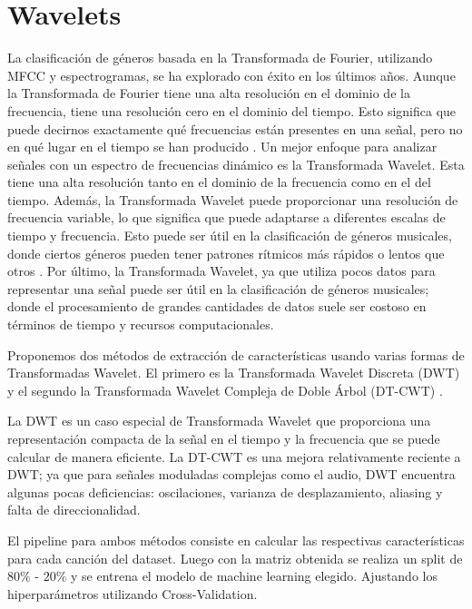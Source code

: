 \documentclass[colorinlistoftodos,twoside,twocolumn,10pt]{article} %
\begin{document}
  
	\section{Wavelets}

La clasificación de géneros basada en la Transformada de Fourier, utilizando MFCC y espectrogramas, se ha explorado con éxito en los últimos años. Aunque la Transformada de Fourier tiene una alta resolución en el dominio de la frecuencia, tiene una resolución cero en el dominio del tiempo. Esto significa que puede decirnos exactamente qué frecuencias están presentes en una señal, pero no en qué lugar en el tiempo se han producido \cite{wavelet transform in machine learning}. Un mejor enfoque para analizar señales con un espectro de frecuencias dinámico es la Transformada Wavelet. Esta tiene una alta resolución tanto en el dominio de la frecuencia como en el del tiempo. Además, la Transformada Wavelet puede proporcionar una resolución de frecuencia variable, lo que significa que puede adaptarse a diferentes escalas de tiempo y frecuencia. Esto puede ser útil en la clasificación de géneros musicales, donde ciertos géneros pueden tener patrones rítmicos más rápidos o lentos que otros \cite{Musical Genre Classification Of Audio Signals}. Por último, la Transformada Wavelet, ya que utiliza pocos datos para representar una señal puede ser útil en la clasificación de géneros musicales; donde el procesamiento de grandes cantidades de datos suele ser costoso en términos de tiempo y recursos computacionales. 

	Proponemos dos métodos de extracción de características usando varias formas de Transformadas Wavelet. 
    El primero es la Transformada Wavelet Discreta (DWT) \cite{wavelet transform in machine learning} y el segundo la Transformada Wavelet Compleja de Doble Árbol (DT-CWT) \cite{DT-CWT}.
    
    La DWT es un caso especial de Transformada Wavelet que proporciona una representación compacta de la señal en el tiempo y la frecuencia que se puede calcular de manera eficiente\cite{Musical Genre Classification Of Audio Signals}. La DT-CWT es una mejora relativamente reciente a DWT; ya que para señales moduladas complejas como el audio, DWT encuentra algunas pocas deficiencias: oscilaciones, varianza de desplazamiento, aliasing y falta de direccionalidad\cite{Wavelet Transform for Music Genre Classification}. 
    
    El pipeline para ambos métodos consiste en calcular las respectivas características para cada canción del dataset. Luego con la matriz obtenida se realiza un split de $80\%$ - $20\%$ y se entrena el modelo de machine learning elegido. Ajustando los hiperparámetros utilizando Cross-Validation.
\end{document}
